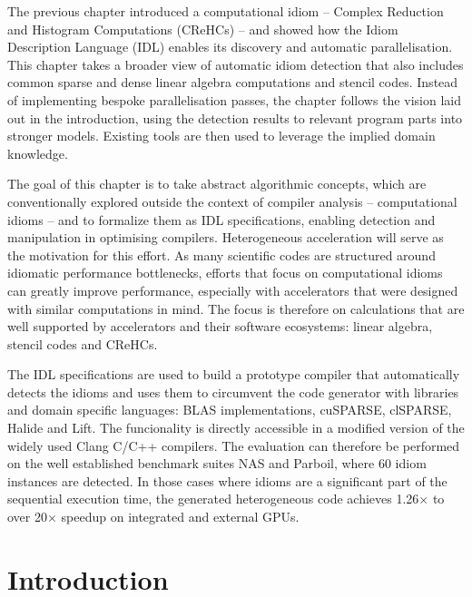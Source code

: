 
    The previous chapter introduced a computational idiom --
    Complex Reduction and Histogram Computations (CReHCs) -- and showed how the
    Idiom Description Language (IDL) enables its discovery and automatic
    parallelisation.
    This chapter takes a broader view of automatic idiom detection that also
    includes common sparse and dense linear algebra computations and stencil
    codes.
    Instead of implementing bespoke parallelisation passes, the chapter
    follows the vision laid out in the introduction, using the detection results
    to relevant program parts into stronger models.
    Existing tools are then used to leverage the implied domain knowledge.

    The goal of this chapter is to take abstract algorithmic concepts, which are
    conventionally explored outside the context of compiler analysis --
    computational idioms -- and to formalize them as IDL specifications,
    enabling detection and manipulation in optimising compilers.
    Heterogeneous acceleration will serve as the motivation for this effort.
    As many scientific codes are structured around idiomatic performance
    bottlenecks, efforts that focus on computational idioms can greatly
    improve performance, especially with accelerators that were designed
    with similar computations in mind.
    The focus is therefore on calculations that are well supported by
    accelerators and their software ecosystems: linear algebra,
    stencil codes and CReHCs.

    The IDL specifications are used to build a prototype compiler that
    automatically detects the idioms and uses them to circumvent the code
    generator with libraries and domain specific languages:
    BLAS implementations, cuSPARSE, clSPARSE, Halide and Lift.
    The funcionality is directly accessible in a modified version of the widely
    used Clang C/C++ compilers.
    The evaluation can therefore be performed on the well established benchmark
    suites NAS and Parboil, where 60 idiom instances are detected.
    In those cases where idioms are a significant part of the sequential
    execution time, the generated heterogeneous code achieves 1.26$\times$ to
    over 20$\times$ speedup on integrated and external GPUs.

\section{Introduction}

